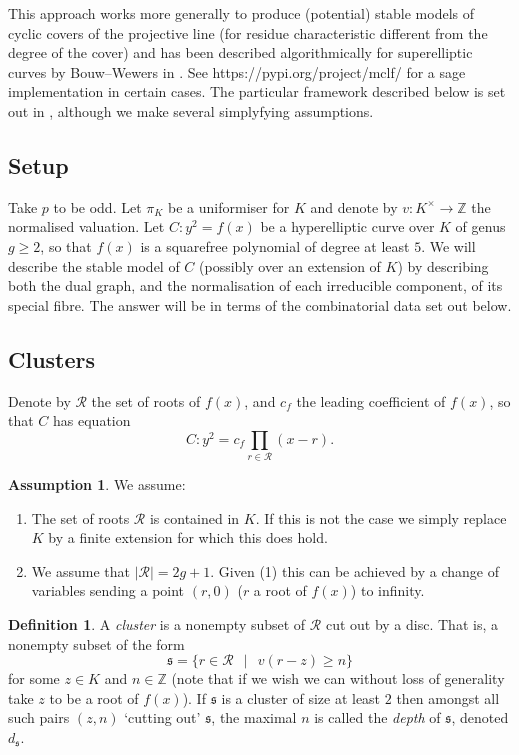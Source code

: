 \documentclass[12pt]{amsart}
\numberwithin{equation}{section}
\theoremstyle{remark}
\theoremstyle{definition}
\theoremstyle{definition}
\theoremstyle{definition}
\newtheorem{defi}[equation]{Definition}
\theoremstyle{definition}
\theoremstyle{definition}
\theoremstyle{definition}
\newtheorem{assumption}[equation]{Assumption}
\begin{document}
 This approach works more generally to produce (potential) stable models of cyclic covers of the projective line (for residue characteristic different from the degree of the cover) and has been described algorithmically for superelliptic curves by Bouw--Wewers in \cite{MR3576328}. See https://pypi.org/project/mclf/ for a sage implementation in certain cases. The particular framework described below is set out in \cite{M2D2}, although we make several simplyfying assumptions.
 
 \subsection{Setup}

Take $p$ to be odd. Let $\pi_K$ be a uniformiser for $K$ and denote by $v:K^\times \rightarrow \mathbb{Z}$ the normalised valuation. Let $C:y^2=f(x)$ be a hyperelliptic curve over $K$ of genus $g\geq 2$, so that $f(x)$ is a squarefree polynomial of degree at least $5$. We will describe the stable model of $C$ (possibly over an extension of $K$) by describing both the dual graph, and the normalisation of each irreducible component, of its special fibre. The answer will be in terms of the combinatorial data set out below.

\subsection{Clusters}

Denote by $\mathcal{R}$ the set of roots of $f(x)$, and $c_f$ the leading coefficient of $f(x)$, so that $C$ has equation
\[C:y^2=c_f\prod_{r\in \mathcal{R}}(x-r).\] 

\begin{assumption}
We assume:
\begin{enumerate}
 \item  The set of roots $\mathcal{R}$ is contained in $K$. If this is not the case we simply replace $K$ by a finite extension for which this does hold. 
 \item We assume that $|\mathcal{R}|=2g+1$. Given (1) this can be achieved by a change of variables sending a point $(r,0)$ ($r$ a root of $f(x)$) to infinity. 
 \end{enumerate}
\end{assumption}

\begin{defi}
A \textit{cluster} is a nonempty subset of $\mathcal{R}$ cut out by a disc. That is, a nonempty subset of the form
\[\mathfrak{s}=\{r\in \mathcal{R}~~\mid~~ v(r-z)\geq n\}\]
for some $z\in K$ and $n\in \mathbb{Z}$ (note that if we wish we can without loss of generality take $z$ to be a root of $f(x)$). If $\mathfrak{s}$ is a cluster of size at least $2$ then amongst all such pairs $(z,n)$ `cutting out' $\mathfrak{s}$, the maximal $n$ is called the \textit{depth} of $\mathfrak{s}$, denoted $d_{\mathfrak{s}}$. 
\end{defi}
\end{document}
